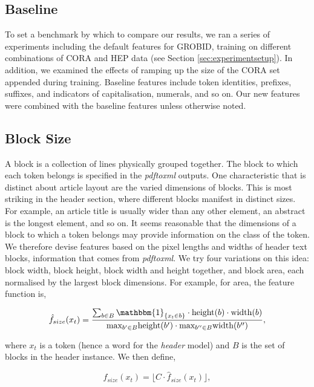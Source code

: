 \subsection{Baseline}

To set a benchmark by which to compare our results, we ran a series of experiments including the default features for GROBID, training on different combinations of CORA and HEP data (see Section \ref{sec:experimentsetup}). In addition, we examined the effects of ramping up the size of the CORA set appended during training. Baseline features include token identities, prefixes, suffixes, and indicators of capitalisation, numerals, and so on. Our new features were combined with the baseline features unless otherwise noted.

\subsection{Block Size}

A block is a collection of lines physically grouped together. The block to which each token belongs is specified in the \emph{pdftoxml} outputs. One characteristic that is distinct about article layout are the varied dimensions of blocks. This is most striking in the header section, where different blocks manifest in distinct sizes. For example, an article title is usually wider than any other element, an abstract is the longest element, and so on. It seems reasonable that the dimensions of a block to which a token belongs may provide information on the class of the token. We therefore devise features based on the pixel lengths and widths of header text blocks, information that comes from \emph{pdftoxml}. We try four variations on this idea: block width, block height, block width and height together, and block area, each normalised by the largest block dimensions. For example, for area, the feature function is,

\begin{equation}
\hat f_{size}(x_t) = \frac{\sum_{b \in B} \mathbbm{1}_{\{x_t \in b\}} \cdot\text{height}(b)\cdot\text{width}(b)}{\text{max}_{b' \in B} \text{height}(b') \cdot \text{max}_{b'' \in B} \text{width}(b'')},
\label{eq:areafunction}
\end{equation}

where $x_t$ is a token (hence a word for the \emph{header} model) and $B$ is the set of blocks in the header instance. We then define,

\begin{equation}
f_{size}(x_t) = \big\lfloor C \cdot\hat f_{size}(x_t)\big\rfloor,
\label{eq:areafunctiondisc}
\end{equation}

